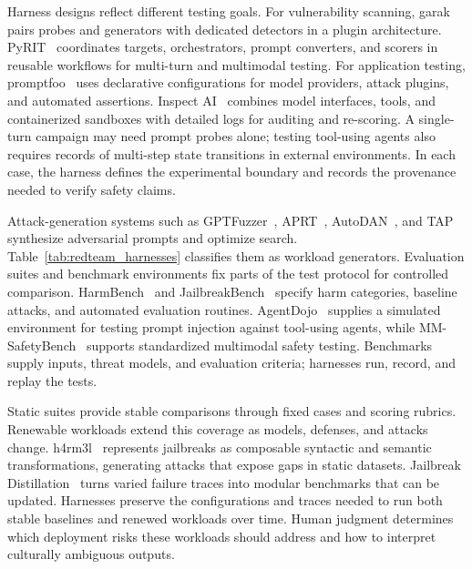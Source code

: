 \documentclass[review]{fcs}
\let\fcsOriginalCite\cite
\renewcommand{\cite}[1]{\allowbreak\fcsOriginalCite{#1}}
\begin{document}
Harness designs reflect different testing goals. For vulnerability scanning, garak~\cite{derczynski2024garak} pairs probes and generators with dedicated detectors in a plugin architecture. PyRIT~\cite{lopezmunoz2024pyrit} coordinates targets, orchestrators, prompt converters, and scorers in reusable workflows for multi-turn and multimodal testing. For application testing, promptfoo~\cite{promptfooDocs} uses declarative configurations for model providers, attack plugins, and automated assertions. Inspect AI~\cite{ukaisi2024inspect} combines model interfaces, tools, and containerized sandboxes with detailed logs for auditing and re-scoring. A single-turn campaign may need prompt probes alone; testing tool-using agents also requires records of multi-step state transitions in external environments. In each case, the harness defines the experimental boundary and records the provenance needed to verify safety claims.

Attack-generation systems such as GPTFuzzer~\cite{yu2023gptfuzzer}, APRT~\cite{jiang2024aprt}, AutoDAN~\cite{liu2024autodan}, and TAP~\cite{mehrotra2024tap} synthesize adversarial prompts and optimize search. Table~\ref{tab:redteam_harnesses} classifies them as workload generators. Evaluation suites and benchmark environments fix parts of the test protocol for controlled comparison. HarmBench~\cite{mazeika2024harmbench} and JailbreakBench~\cite{chao2024jailbreakbench} specify harm categories, baseline attacks, and automated evaluation routines. AgentDojo~\cite{debenedetti2024agentdojo} supplies a simulated environment for testing prompt injection against tool-using agents, while MM-SafetyBench~\cite{liu2024mmsafetybench} supports standardized multimodal safety testing. Benchmarks supply inputs, threat models, and evaluation criteria; harnesses run, record, and replay the tests.

Static suites provide stable comparisons through fixed cases and scoring rubrics. Renewable workloads extend this coverage as models, defenses, and attacks change. h4rm3l~\cite{doumbouya2025h4rm3l} represents jailbreaks as composable syntactic and semantic transformations, generating attacks that expose gaps in static datasets. Jailbreak Distillation~\cite{zhang2025jbdistill} turns varied failure traces into modular benchmarks that can be updated. Harnesses preserve the configurations and traces needed to run both stable baselines and renewed workloads over time. Human judgment determines which deployment risks these workloads should address and how to interpret culturally ambiguous outputs.
\end{document}
